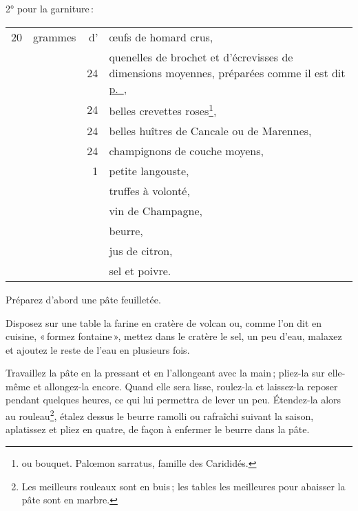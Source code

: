 2° pour la garniture :



\footnotesize
\begin{longtable}{rrrp{16em}}
     20 & grammes & d' & œufs de homard crus,                                                             \\
        &         & 24 & quenelles de brochet et d'écrevisses de dimensions moyennes,
                         préparées comme il est dit \hyperlink{p0328}{p. \pageref{pg0328}},               \\
        &         & 24 & belles crevettes roses\footnote{ou bouquet. Palœmon sarratus,
                         famille des Carididés.},                                                         \\
        &         & 24 & belles huîtres de Cancale ou de Marennes,                                        \\
        &         & 24 & champignons de couche moyens,                                                    \\
        &         &  1 & petite langouste,                                                                \\
        &         &    & truffes à volonté,                                                               \\
        &         &    & vin de Champagne,                                                                \\
        &         &    & beurre,                                                                          \\
        &         &    & jus de citron,                                                                   \\
        &         &    & sel et poivre.                                                                   \\
\end{longtable}
\normalsize

Préparez d'abord une pâte feuilletée.

Disposez sur une table la farine en cratère de volcan ou, comme l'on dit en
cuisine, « formez fontaine », mettez dans le cratère le sel, un peu d'eau,
malaxez et ajoutez le reste de l'eau en plusieurs fois.

Travaillez la pâte en la pressant et en l’allongeant avec la main ; pliez-la
sur elle-même et allongez-la encore. Quand elle sera lisse, roulez-la et
laissez-la reposer pendant quelques heures, ce qui lui permettra de lever un
peu. Étendez-la alors au rouleau\footnote{Les meilleurs rouleaux sont en buis ;
les tables les meilleures pour abaisser la pâte sont en marbre.}, étalez dessus
le beurre ramolli ou rafraîchi suivant la saison, aplatissez et pliez en
quatre, de façon à enfermer le beurre dans la pâte.

